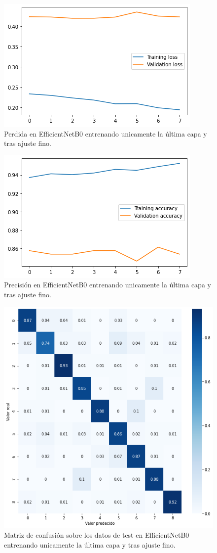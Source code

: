 \begin{figure}[H]
  \centering
  \includegraphics[width=0.5\linewidth]{Imagenes/entrenamiento_redes/ult/efficientnet_fine_loss.png}
  \caption{Perdida en EfficientNetB0 entrenando unicamente la última capa y tras ajuste fino.}
\end{figure}

\begin{figure}[H]
  \centering
  \includegraphics[width=0.5\linewidth]{Imagenes/entrenamiento_redes/ult/efficientnet_fine_acc.png}
  \caption{Precisión en EfficientNetB0 entrenando unicamente la última capa y tras ajuste fino.}
\end{figure}

\begin{figure}[H]
  \centering
  \includegraphics[width=0.5\linewidth]{Imagenes/entrenamiento_redes/ult/efficientnet_fine_matriz.png}
  \caption{Matriz de confusión sobre los datos de test en EfficientNetB0 entrenando unicamente la última capa y tras ajuste fino.}
\end{figure}

